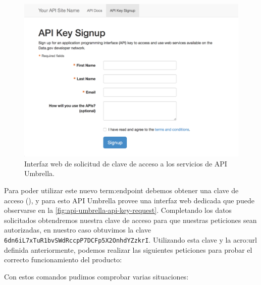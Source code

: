 \begin{figure}
  \includegraphics[width=\linewidth]{src/images/02-capitulo-2/tecnologias/api-umbrella/api-key-request.png}
  \caption{Interfaz web de solicitud de clave de acceso a los servicios de API Umbrella.}
  \label{fig:api-umbrella-api-key-request}
\end{figure}

Para poder utilizar este nuevo \gls{term:endpoint} debemos obtener una clave de acceso (), y para esto API Umbrella provee una interfaz web dedicada que puede observarse en la \autoref{fig:api-umbrella-api-key-request}. Completando los datos solicitados obtendremos nuestra clave de acceso para que nuestras peticiones sean autorizadas, en nuestro caso obtuvimos la clave \texttt{6dn6iL7xTuR1bvSWdRccpP7DCFp5X2OnhdYZzkrI}. Utilizando esta clave y la \gls{acro:url} definida anteriormente, podemos realizar las siguientes peticiones para probar el correcto funcionamiento del producto:


Con estos comandos pudimos comprobar varias situaciones:

